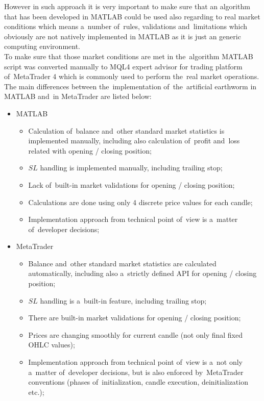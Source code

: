 \documentclass[runningheads,a4paper]{llncs}
\begin{document}
However in such approach it is very important to make sure that an algorithm that has been developed in MATLAB could be used also regarding to real market conditions which means a~number of~rules, validations and~limitations which obviously are not natively implemented in MATLAB as it is just an generic computing environment.\\

To make sure that those market conditions are met in the~algorithm MATLAB script was converted manually to MQL4 expert advisor for trading platform of~MetaTrader 4 which is commonly used to perform the~real market operations.\\

The main differences between the~implementation of~the~artificial earthworm in MATLAB and~in MetaTrader are listed below:
\begin{itemize}
\item MATLAB
\begin{itemize}
\item Calculation of~balance and~other standard market statistics is implemented manually, including also calculation of~profit and~loss related with opening / closing position;
\item $SL$ handling is implemented manually, including trailing stop;
\item Lack of~built-in market validations for opening / closing position;
\item Calculations are done using only 4 discrete price values for each candle;
\item Implementation approach from technical point of~view is a~matter of~developer decisions;
\end{itemize}
\item MetaTrader
\begin{itemize}
\item Balance and~other standard market statistics are calculated automatically, including also a~strictly defined API for opening / closing position;
\item $SL$ handling is a~built-in feature, including trailing stop;
\item There are built-in market validations for opening / closing position;
\item Prices are changing smoothly for current candle (not only final fixed OHLC values);
\item Implementation approach from technical point of~view is a~not only a~matter of~developer decisions, but is also enforced by~MetaTrader conventions (phases of~initialization, candle execution, deinitialization etc.);
\end{itemize}
\end{itemize}
\end{document}
